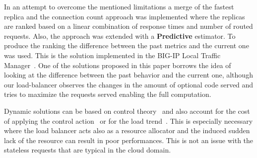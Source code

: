 In an attempt to overcome the mentioned limitations a merge of the
fastest replica and the connection count approach was implemented
where the replicas are ranked based on a linear combination of
response times and number of routed requests. Also, the approach was
extended with a \textbf{Predictive} estimator. To produce the ranking
the difference between the past metrics and the current one was
used. This is the solution implemented in the BIG-IP Local Traffic
Manager~\cite{BIGIP}. One of the solutions proposed in this paper
borrows the idea of looking at the difference between the past
behavior and the current one, although our load-balancer observes the
changes in the amount of optional code served and tries to maximize
the requests served enabling the full computation.

Dynamic solutions can be based on control
theory~\cite{multipathctlb,comparisonstaticdynamic} and also account
for the cost of applying the control action~\cite{costofcontrol} or for
the load trend~\cite{CasolariSA}. This is especially necessary where 
the load balancer acts also as a resource allocator and the induced 
sudden lack of the resource can result in poor performances. This is 
not an issue with the stateless requests that are typical in the cloud 
domain.

